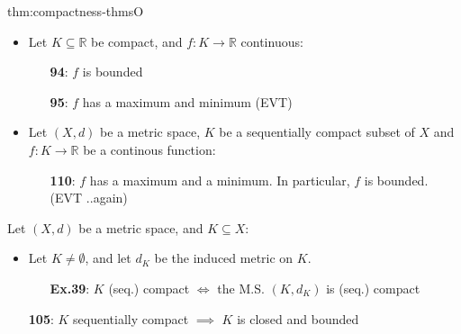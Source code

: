 \documentclass[landscape, 8pt]{extarticle}
\begin{document}
\begin{multicols}{3}
\begin{thm}{thm:compactness-thms}{O}
    \vspace{-8pt}
    \vspace{-7pt}
    \begin{itemize}[leftmargin=1.5em]
        \item Let $K \subseteq \mathbb{R}$ be compact, and $f : K \to \mathbb{R}$ continuous:
            \vspace{-5pt}
            \begin{itemize}
                \item[\textbf{94}:] $f$ is bounded
                \item[\textbf{95}:] $f$ has a maximum and minimum (EVT)
            \end{itemize}
        \vspace{-5pt}
        \item Let $(X, d)$ be a metric space, $K$ be a sequentially compact subset of $X$ and $f : K \to \mathbb{R}$ be a continous function:
            \vspace{-5pt}
            \begin{itemize}
                \item[\textbf{110}:] $f$ has a maximum and a minimum. In particular, $f$ is bounded. (EVT ..again)
            \end{itemize} 
    \end{itemize}

    \vspace{-5pt}
    \vspace{-3pt}

    Let $(X, d)$ be a metric space, and $K \subseteq X$:
    \vspace{-5pt}
    \begin{itemize}[leftmargin=1.5em]
        \item Let $K\ne\emptyset$, and let $d_{K}$ be the induced metric on $K$.
            \vspace{-3pt}
            \begin{itemize}
                \item[\textbf{Ex.39}:] $K$ (seq.) compact $\iff$ the M.S. $(K, d_{K})$ is (seq.) compact
            \end{itemize}
            
            \vspace{-2pt}
        \item[\textbf{105}:] $K$ sequentially compact $\implies$ $K$ is closed and bounded


\end{itemize}
\end{thm}
\end{multicols}
\end{document}
